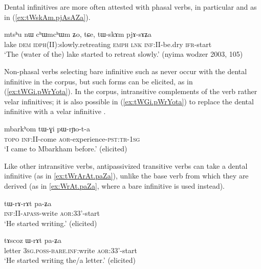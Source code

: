 Dental infinitives are more often attested with phasal verbs, in particular  and  as in (\ref{ex:tWskAm.pjAsAZa}).

\begin{exe}
\ex \label{ex:tWskAm.pjAsAZa}
\gll mtsʰu nɯ cʰɯmcʰɯm ʑo, tɕe, tɯ-skɤm pjɤ-sɤʑa \\
lake \textsc{dem} \textsc{idph}(II):slowly.retreating \textsc{emph} \textsc{lnk} \textsc{inf}:II-be.dry \textsc{ifr}-start \\
\glt `The (water of the) lake started to retreat slowly.' (nyima wodzer 2003, 105)
\end{exe}

Non-phasal verbs selecting bare infinitive such as  never occur with the dental infinitive in the corpus, but such forms can be elicited, as in (\ref{ex:tWGi.pWrYota}). In the corpus, intransitive complements of the verb  rather velar infinitives; it is also possible  in (\ref{ex:tWGi.pWrYota}) to replace the dental infinitive  with a velar infinitive .

\begin{exe}
\ex \label{ex:tWGi.pWrYota}
\gll  mbarkʰom tɯ-ɣi pɯ-rɲo-t-a  \\
\textsc{topo} \textsc{inf}:II-come \textsc{aor}-experience-\textsc{pst}:\textsc{tr}-\textsc{1sg} \\
\glt `I came to Mbarkham before.' (elicited)
\end{exe}

Like other intransitive verbs, antipassivized transitive verbs can take a dental infinitive (as in \ref{ex:tWrArAt.paZa}), unlike the base verb from which they are derived (as in \ref{ex:WrAt.paZa}, where a bare infinitive is used instead).

\begin{exe}
\ex \label{ex:tWrArAt.paZa}
\gll tɯ-rɤ-rɤt pa-ʑa \\
\textsc{inf}:II-\textsc{apass}-write \textsc{aor}:3\fl{}3'-start \\
\glt `He started writing.' (elicited)
\end{exe}

\begin{exe}
\ex \label{ex:WrAt.paZa}
\gll tɤscoz ɯ-rɤt pa-ʑa \\
letter \textsc{3sg}.\textsc{poss}-\textsc{bare}.\textsc{inf:}write \textsc{aor}:3\fl{}3'-start \\
\glt `He started writing the/a letter.' (elicited)
\end{exe}

